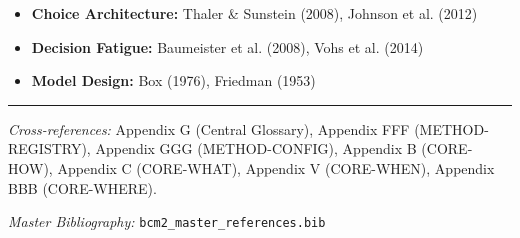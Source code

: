 \begin{itemize}[nosep]
    \item \textbf{Choice Architecture:} Thaler \& Sunstein (2008), Johnson et al. (2012)
    \item \textbf{Decision Fatigue:} Baumeister et al. (2008), Vohs et al. (2014)
    \item \textbf{Model Design:} Box (1976), Friedman (1953)
\end{itemize}

\nocite{bcm_master}



\vspace{1em}
\hrule
\vspace{0.5em}

\noindent\textit{Cross-references:}
Appendix G (Central Glossary),
Appendix FFF (METHOD-REGISTRY),
Appendix GGG (METHOD-CONFIG),
Appendix B (CORE-HOW),
Appendix C (CORE-WHAT),
Appendix V (CORE-WHEN),
Appendix BBB (CORE-WHERE).

\noindent\textit{Master Bibliography:} \texttt{bcm2\_master\_references.bib}


